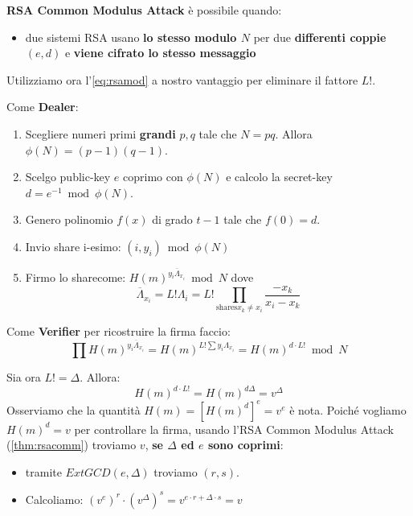 \begin{remark}\textbf{RSA Common Modulus Attack} è possibile quando:
\begin{itemize}
    \item due sistemi RSA usano \textbf{lo stesso modulo $N$} per due \textbf{differenti coppie} $(e,d)$ e \textbf{viene cifrato lo stesso messaggio}
\end{itemize}
\end{remark}
Utilizziamo ora l'\cref{eq:rsamod} a nostro vantaggio per eliminare il fattore $L!$.
\begin{definition}\label{def:shouprsa}
Come \textbf{Dealer}:
\begin{enumerate}
    \item Scegliere numeri primi \textbf{grandi} $p,q$ tale che $N=pq$. Allora $\phi(N)=(p-1)(q-1)$.
    \item Scelgo public-key $e$ coprimo con $\phi(N)$ e calcolo la secret-key $d=e^{-1}\bmod\phi(N)$.
    \item Genero polinomio $f(x)$ di grado $t-1$ tale che $f(0)=d$.
    \item Invio share i-esimo: $(i,y_i)\bmod\phi(N)$
    \item Firmo lo share\footnotemark come: $H(m)^{y_i\overline{\Lambda}_{x_i}}\bmod N$ dove
    \[\overline{\Lambda}_{x_i}=L!\Lambda_i=L!\prod_{\text{shares} x_k\ne x_i}\frac{-x_k}{x_i-x_k}\]
\end{enumerate}
Come \textbf{Verifier} per ricostruire la firma faccio:
\[\prod H(m)^{y_i\overline{\Lambda}_{x_i}}=H(m)^{L!\sum y_i\Lambda_{x_i}}=H(m)^{d\cdot L!}\bmod{N}\]
\begin{remark}
Sia ora $L!=\Delta$. Allora:
\[H(m)^{d\cdot L!}=H(m)^{d\Delta}=v^{\Delta}\]
Osserviamo che la quantità $H(m)=[H(m)^{d}]^e=v^e$ è nota\footnotemark.
Poiché vogliamo $H(m)^d=v$ per controllare la firma, usando l'RSA Common Modulus Attack (\cref{thm:rsacomm}) troviamo $v$, \textbf{se $\Delta$ ed $e$ sono coprimi\footnotemark}:
\begin{itemize}
    \item tramite $ExtGCD(e,\Delta)$ troviamo $(r,s)$.
    \item Calcoliamo: $(v^{e})^r\cdot (v^{\Delta})^s=v^{e\cdot r+\Delta\cdot s}=v$
\end{itemize}
\end{remark}
\end{definition}
